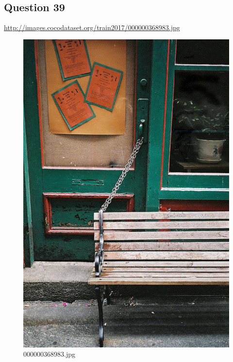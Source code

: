 \subsection*{Question 39}
\url{http://images.cocodataset.org/train2017/000000368983.jpg}
    \begin{figure}[h]
        \centering
        \includegraphics[width=0.8\linewidth]{../image set/easy/000000368983.jpg}
        \caption{000000368983.jpg}
    \end{figure}
